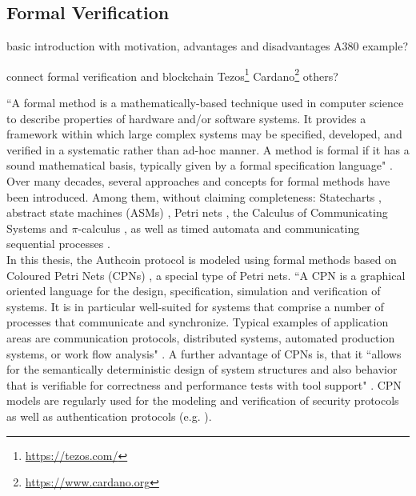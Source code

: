 \documentclass{llncs}
\begin{document}
{		%
		
		\subsection{Formal Verification}
			\label{ss:formal-verification}

			basic introduction with motivation, advantages and disadvantages
			A380 example?
			
			
			connect formal verification and blockchain
			Tezos\footnote{\url{https://tezos.com/}} \cite{tezosWhitepaper}
			Cardano\footnote{\url{https://www.cardano.org}} \cite{bibid}
			others?
			
			
``A formal method is a mathematically-based technique used in computer science to describe properties of hardware and/or software systems. It provides a framework within which large complex systems may be specified, developed, and verified in a systematic rather than ad-hoc manner. A method is formal if it has a sound mathematical basis, typically given by a formal specification language" \cite{wing1990specifier}. Over many decades, several approaches and concepts for formal methods have been introduced. Among them, without claiming completeness: Statecharts \cite{harel1987statecharts}, abstract state machines (ASMs) \cite{gurevich1995evolving}, Petri nets \cite{petri1962kommunikation}, the Calculus of Communicating Systems \cite{milner1989communication} and $\pi$-calculus \cite{milner1992calculus}, as well as timed automata \cite{alur1994theory} and communicating sequential processes \cite{hoare1978communicating}.\\
In this thesis, the Authcoin protocol is modeled using formal methods based on Coloured Petri Nets (CPNs) \cite{jensen1993coloured}, a special type of Petri nets. ``A CPN is a graphical oriented language for the design, specification, simulation and verification of systems. It is in particular well-suited for systems that comprise a number of processes that communicate and synchronize. Typical examples of application areas are communication protocols, distributed systems, automated production systems, or work flow analysis" \cite{norta2012safeguardingPages176}. A further advantage of CPNs is, that it ``allows for the semantically deterministic design of system structures and also behavior that is verifiable for correctness and performance tests with tool support" \cite{norta2012safeguardingPages176}. CPN models are regularly used for the modeling and verification of security protocols as well as authentication protocols (e.g. \cite{crazzolara2001events}\cite{aly2004protocol}\cite{basyouni1997new}\cite{dresp2005security}\cite{sornkhom2008security}\cite{edwards1999cryptographic}\cite{al2005modeling}). \\	

}
\end{document}
